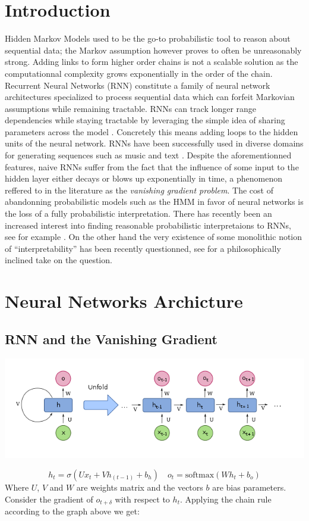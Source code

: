 \documentclass{article}
\begin{document}
\section{Introduction}
Hidden Markov Models used to be the go-to probabilistic tool to reason about
sequential data; the Markov assumption however proves to often be unreasonably
strong. Adding links to form higher order chains is not a scalable solution as
the computationnal complexity grows exponentially in the order of the chain.
Recurrent Neural Networks (RNN) constitute a family of neural network
architectures specialized to process sequential data which can forfeit
Markovian assumptions while remaining tractable.  RNNs can track longer range
dependencies while staying tractable by leveraging the simple idea of sharing
parameters across the model \cite{deeplearning}.  Concretely this means adding
loops to the hidden units of the neural network.  RNNs have been successfully
used in diverse domains for generating sequences such as music and text
\cite{gravesGenerating}.  Despite the aforementionned features, naive RNNs
suffer from the fact that the influence of some input to the hidden layer
either decays or blows up exponentially in time, a phenomenon reffered to in
the literature as the \textit{vanishing gradient problem}.  The cost of
abandonning probabilistic models such as the HMM in favor of neural networks is
the loss of a fully probabilistic interpretation. There has recently been an
increased interest into finding reasonable probabilistic interpretaions to
RNNs, see for example \cite{inter}. On the other hand the very existence of
some monolithic notion of ``interpretability'' has been recently questionned,
see \cite{mythos} for a philosophically inclined take on the question.

\section{Neural Networks Archicture}
\subsection{RNN and the Vanishing Gradient}
\begin{center}
    \includegraphics[width=\columnwidth]{RNN.png}
\end{center}
\begin{equation*}
    h_t = \sigma(U x_t + V h_{(t-1)} + b_h)
    \quad o_t = \text{softmax}(W h_t + b_o)
\end{equation*}
Where $ U$, $V$ and $W$ are weights matrix and the vectors $b$ are bias
parameters. Consider the gradient of $o_{t + \delta}$ with respect
to $h_t$. Applying the chain rule according to the graph above we get:
\end{document}
